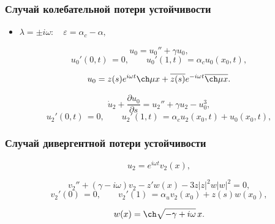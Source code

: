 \documentclass[fullscreen=true, unicode, bookmarks=false]{beamer}
\begin{document}
\begin{frame}
\frametitle{ Случай колебательной потери устойчивости }

\begin{itemize}
\item { $ \lambda = \pm i \omega: \quad \varepsilon=\alpha_c-\alpha, $
}
\end{itemize}

\medskip

\begin{equation}
	u_0 = u_0'' + \gamma u_0,
\end{equation}
\begin{equation}
	u_0'(0, t) \, = 0, \qquad u_0'(1, t) \, = \alpha_c u_0(x_0, t),
\end{equation}

$$ u_0 = z(s) e^{i \omega t} \ch \mu x + \overline{z(s)} e^{-i \omega t} \overline{\ch \mu x}. $$

\medskip

\begin{equation}
	\dot u_2 + \frac{\partial u_0}{\partial s} = u_2'' + \gamma u_2 - u_0^3,
\end{equation}
\begin{equation}
	u_2'(0, t) \, = 0, \qquad u_2'(1, t) \, = \alpha_c u_2(x_0, t) + u_0(x_0, t),
\end{equation}


\end{frame}

\begin{frame}
\frametitle{ Случай дивергентной потери устойчивости }

$$ u_2 = e^{i \omega t} v_2(x), $$

\bigskip
\pause

\begin{equation}
	v_2'' + (\gamma - i \omega) v_2 - z' w(x) - 3z|z|^2 w|w|^2 = 0,
\end{equation}
\begin{equation}
	v_2'(0) \, = 0, \qquad v_2'(1) \, = \alpha_u v_2(x_0) + z(s) w(x_0),
\end{equation}

$$ w(x) = \ch \sqrt{-\gamma + i \omega} \, x. $$

\end{frame}
\end{document}
